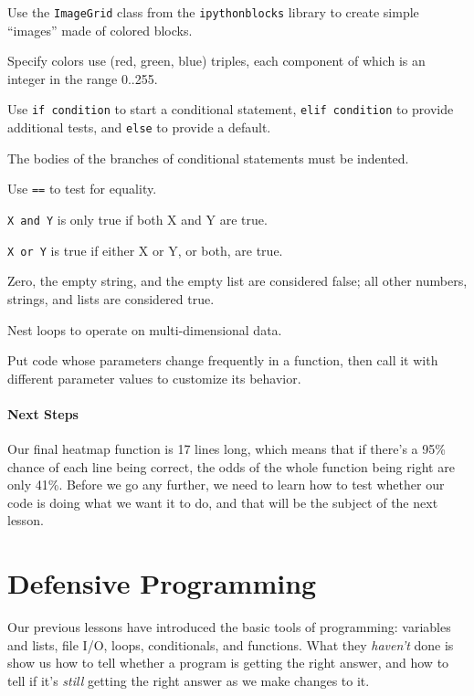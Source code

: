 \documentclass{book}
\begin{document}
\begin{keypoints}
\begin{swcitemize}
\item
  Use the \texttt{ImageGrid} class from the \texttt{ipythonblocks}
  library to create simple ``images'' made of colored blocks.
\item
  Specify colors use (red, green, blue) triples, each component of which
  is an integer in the range 0..255.
\item
  Use \texttt{if condition} to start a conditional statement,
  \texttt{elif condition} to provide additional tests, and \texttt{else}
  to provide a default.
\item
  The bodies of the branches of conditional statements must be indented.
\item
  Use \texttt{==} to test for equality.
\item
  \texttt{X and Y} is only true if both X and Y are true.
\item
  \texttt{X or Y} is true if either X or Y, or both, are true.
\item
  Zero, the empty string, and the empty list are considered false; all
  other numbers, strings, and lists are considered true.
\item
  Nest loops to operate on multi-dimensional data.
\item
  Put code whose parameters change frequently in a function, then call
  it with different parameter values to customize its behavior.
\end{swcitemize}
\end{keypoints}

\mbox{}\paragraph{Next Steps}

Our final heatmap function is 17 lines long, which means that if there's
a 95\% chance of each line being correct, the odds of the whole function
being right are only 41\%. Before we go any further, we need to learn
how to test whether our code is doing what we want it to do, and that
will be the subject of the next lesson.

\section{Defensive Programming}

Our previous lessons have introduced the basic tools of programming:
variables and lists, file I/O, loops, conditionals, and functions. What
they \emph{haven't} done is show us how to tell whether a program is
getting the right answer, and how to tell if it's \emph{still} getting
the right answer as we make changes to it.
\end{document}
